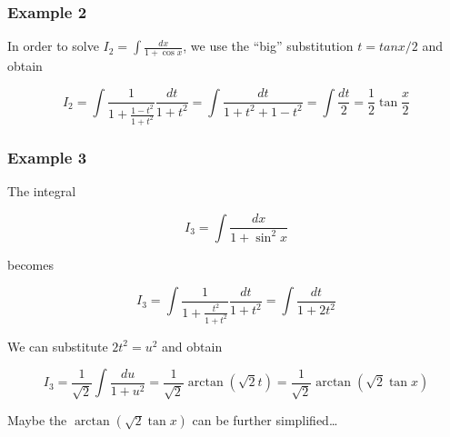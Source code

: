 \subsubsection{Example 2}

In order to solve \(I_2 = \int \frac{dx}{1+\cos x}\), we use the ``big''
substitution \(t=tan x/2\) and obtain

\[
I_2 = \int \frac{1}{1+\frac{1-t^2}{1+t^2}} \frac{dt}{1+t^2} = \int \frac{dt}{1+t^2+1-t^2} = \int \frac{dt}{2} = \frac{1}{2} \tan \frac{x}{2}
\]

\subsubsection{Example 3}

The integral

\[
I_3 = \int \frac{dx}{1+  \sin^2 x}
\]

becomes

\[
I_3 = \int \frac{1}{1 + \frac{t^2}{1+t^2}} \frac{dt}{1+t^2} = \int \frac{dt}{1+2t^2}
\]

We can substitute \(2t^2=u^2\) and obtain

\[
I_3 = \frac{1}{\sqrt{2}} \int \frac{du}{1+u^2} = \frac{1}{\sqrt{2}} \arctan(\sqrt{2}t) = \frac{1}{\sqrt{2}} \arctan \left( \sqrt{2} \tan x \right)
\]

Maybe the \(\arctan (\sqrt{2} \tan x)\) can be further
simplified\ldots{}
